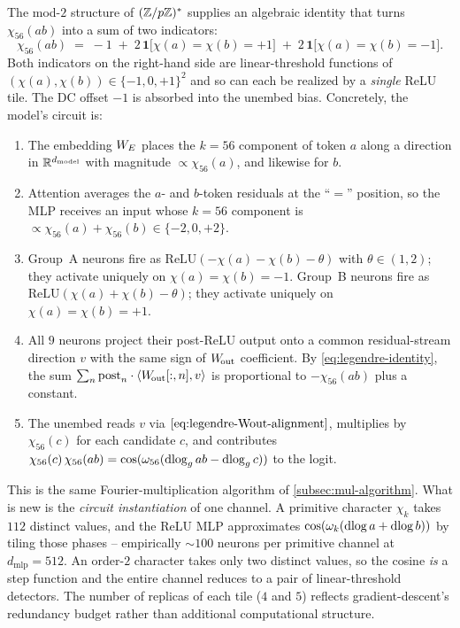 The mod-$\!2$ structure of $(\mathbb{Z}/p\mathbb{Z})^*$ supplies an algebraic identity
that turns $\chi_{56}(ab)$ into a sum of two indicators:
\begin{equation}
  \chi_{56}(ab)
  \;=\; -1
   \;+\; 2\,\mathbf{1}\bigl[\chi(a) = \chi(b) = +1\bigr]
   \;+\; 2\,\mathbf{1}\bigl[\chi(a) = \chi(b) = -1\bigr].
  \label{eq:legendre-identity}
\end{equation}
Both indicators on the right-hand side are linear-threshold functions
of $(\chi(a), \chi(b)) \in \{-1, 0, +1\}^2$ and so can each be realized
by a \emph{single} ReLU tile.  The DC offset $-1$ is absorbed into the
unembed bias.  Concretely, the model's circuit is:
\begin{enumerate}[leftmargin=2em]
  \item The embedding $W_E$ places the $k = 56$ component of token $a$
    along a direction in $\mathbb{R}^{d_{\text{model}}}$ with magnitude
    $\propto \chi_{56}(a)$, and likewise for $b$.
  \item Attention averages the $a$- and $b$-token residuals at the
    ``$=$'' position, so the MLP receives an input whose $k=56$
    component is $\propto \chi_{56}(a) + \chi_{56}(b) \in \{-2, 0, +2\}$.
  \item Group~A neurons fire as $\mathrm{ReLU}(-\chi(a) - \chi(b) -
    \theta)$ with $\theta \in (1, 2)$; they activate uniquely on
    $\chi(a) = \chi(b) = -1$.  Group~B neurons fire as
    $\mathrm{ReLU}(\chi(a) + \chi(b) - \theta)$; they activate
    uniquely on $\chi(a) = \chi(b) = +1$.
  \item All $9$ neurons project their post-ReLU output onto a common
    residual-stream direction $v$ with the same sign of $W_{\!\text{out}}$
    coefficient.  By
    \cref{eq:legendre-identity},
    the sum $\sum_n \mathrm{post}_n \cdot \langle W_{\!\text{out}}[:, n], v\rangle$
    is proportional to $-\chi_{56}(ab)$ plus a constant.
  \item The unembed reads $v$ via
    $\cref{eq:legendre-Wout-alignment}$, multiplies by $\chi_{56}(c)$
    for each candidate $c$, and contributes $\chi_{56}(c)\,\chi_{56}(ab)
    = \cos(\omega_{56}(\operatorname{dlog}_g ab - \operatorname{dlog}_g c))$ to the logit.
\end{enumerate}

This is the same Fourier-multiplication algorithm of
\cref{subsec:mul-algorithm}.  What is new is the
\emph{circuit instantiation} of one channel.  A primitive character
$\chi_k$ takes $112$ distinct values, and the ReLU MLP approximates
$\cos(\omega_k(\operatorname{dlog} a + \operatorname{dlog} b))$ by tiling those phases -- empirically
$\sim 100$ neurons per primitive channel at $d_{\text{mlp}} = 512$.  An
order-$2$ character takes only two distinct values, so the cosine
\emph{is} a step function and the entire channel reduces to a pair of
linear-threshold detectors. The number of replicas of each tile
($4$ and $5$) reflects gradient-descent's redundancy budget rather
than additional computational structure.

